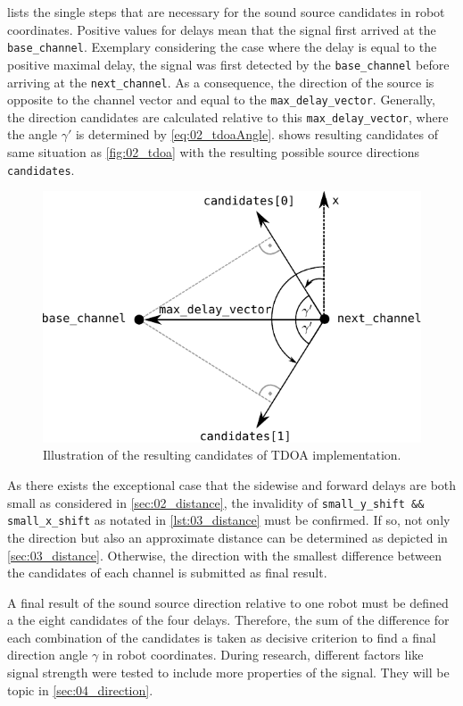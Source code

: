  lists the single steps that are necessary for the sound source
candidates in robot coordinates.
Positive values for delays mean that the signal first arrived at the \lstinline!base_channel!.
Exemplary considering the case where the delay is equal to the positive maximal delay,
the signal was first
detected by the \lstinline!base_channel! before arriving at the \lstinline!next_channel!.
As a consequence, the direction of the source is opposite to the channel vector and equal
to the \lstinline!max_delay_vector!.
Generally, the direction candidates are calculated relative to this \lstinline!max_delay_vector!,
where the angle $\gamma'$ is determined by \cref{eq:02_tdoaAngle}.
 shows resulting candidates of same situation as \cref{fig:02_tdoa} with
the resulting possible source directions \lstinline!candidates!.
\begin{figure}[ht]
	\centering
		\includegraphics[width=0.6\columnwidth]{figures/tdoa_code}
	\caption{Illustration of the resulting candidates of \ac{TDOA} implementation.}
	\label{fig:03_tdoaCode}
\end{figure}

As there exists the exceptional case that the sidewise and forward delays are both small
as considered in \cref{sec:02_distance}, the invalidity of
\lstinline!small_y_shift && small_x_shift! as notated in \cref{lst:03_distance} must
be confirmed.
If so, not only the direction but also an approximate distance can be determined
as depicted in \cref{sec:03_distance}.
Otherwise, the direction with the smallest difference between the
candidates of each channel is submitted as final result.

A final result of the sound source direction relative to one robot must be defined
a the eight candidates of the four delays.
Therefore, the sum of the difference for each combination of the candidates
is taken as decisive criterion to find a final direction angle $\gamma$ in robot coordinates.
During research, different factors like signal strength were tested to include
more properties of the signal. They will be topic in \ref{sec:04_direction}.